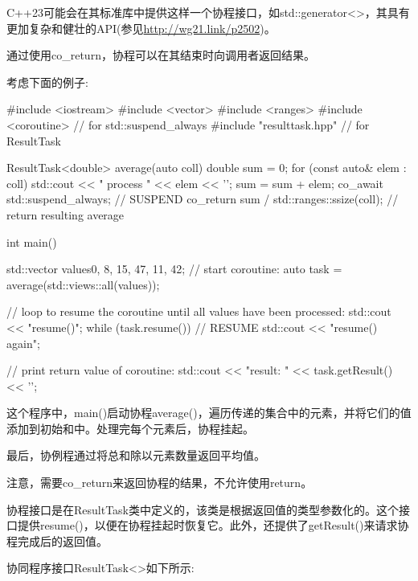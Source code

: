 C++23可能会在其标准库中提供这样一个协程接口，如std::generator<>，其具有更加复杂和健壮的API(参见\url{http://wg21.link/p2502})。


通过使用co\_return，协程可以在其结束时向调用者返回结果。

考虑下面的例子:


\begin{cpp}
#include <iostream>
#include <vector>
#include <ranges>
#include <coroutine> // for std::suspend_always{}
#include "resulttask.hpp" // for ResultTask

ResultTask<double> average(auto coll)
{
	double sum = 0;
	for (const auto& elem : coll) {
		std::cout << " process " << elem << '\n';
		sum = sum + elem;
		co_await std::suspend_always{}; // SUSPEND
	}
	co_return sum / std::ranges::ssize(coll); // return resulting average
}

int main()
{
	std::vector values{0, 8, 15, 47, 11, 42};
	// start coroutine:
	auto task = average(std::views::all(values));
	
	// loop to resume the coroutine until all values have been processed:
	std::cout << "resume()\n";
	while (task.resume()) { // RESUME
		std::cout << "resume() again\n";
	}
	
	// print return value of coroutine:
	std::cout << "result: " << task.getResult() << '\n';
}
\end{cpp}

这个程序中，main()启动协程average()，遍历传递的集合中的元素，并将它们的值添加到初始和中。处理完每个元素后，协程挂起。

最后，协例程通过将总和除以元素数量返回平均值。

注意，需要co\_return来返回协程的结果，不允许使用return。

协程接口是在ResultTask类中定义的，该类是根据返回值的类型参数化的。这个接口提供resume()，以便在协程挂起时恢复它。此外，还提供了getResult()来请求协程完成后的返回值。

协同程序接口ResultTask<>如下所示:



